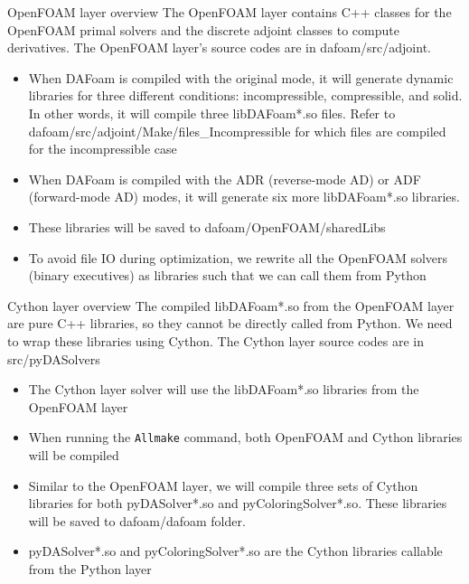 \documentclass{bredelebeamer}
\begin{document}
\begin{frame}[fragile]{OpenFOAM layer overview}
  The OpenFOAM layer contains C++ classes for the OpenFOAM primal solvers and the discrete adjoint classes to compute derivatives. The OpenFOAM layer's source codes are in dafoam/src/adjoint.
  \begin{itemize}
    \setlength\itemsep{1em}
    \item When DAFoam is compiled with the original mode, it will generate dynamic libraries for three different conditions: incompressible, compressible, and solid. In other words, it will compile three libDAFoam*.so files. Refer to dafoam/src/adjoint/Make/files\_Incompressible for which files are compiled for the incompressible case
    \item When DAFoam is compiled with the ADR (reverse-mode AD) or ADF (forward-mode AD) modes, it will generate six more libDAFoam*.so libraries.
    \item These libraries will be saved to dafoam/OpenFOAM/sharedLibs
    \item To avoid file IO during optimization, we rewrite all the OpenFOAM solvers (binary executives) as libraries such that we can call them from Python
  \end{itemize}
\end{frame}

\begin{frame}[fragile]{Cython layer overview}
The compiled libDAFoam*.so from the OpenFOAM layer are pure C++ libraries, so they cannot be directly called from Python. We need to wrap these libraries using Cython. The Cython layer source codes are in src/pyDASolvers
  \begin{itemize}
    \setlength\itemsep{1em}
    \item The Cython layer solver will use the libDAFoam*.so libraries from the OpenFOAM layer
    \item When running the \texttt{Allmake} command, both OpenFOAM and Cython libraries will be compiled
    \item Similar to the OpenFOAM layer, we will compile three sets of Cython libraries for both pyDASolver*.so and pyColoringSolver*.so. These libraries will be saved to dafoam/dafoam folder.
    \item pyDASolver*.so and pyColoringSolver*.so are the Cython libraries callable from the Python layer
    
  \end{itemize}
\end{frame}
\end{document}
